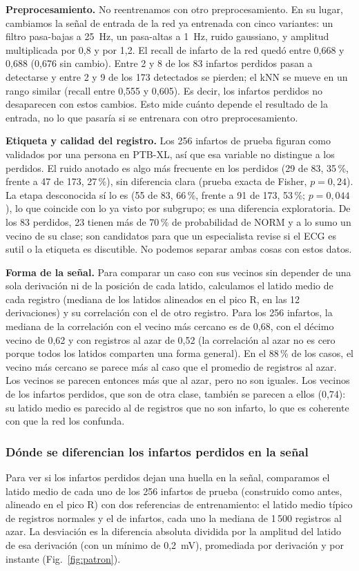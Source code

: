 \documentclass[conference]{IEEEtran}
\begin{document}
\textbf{Preprocesamiento.} No reentrenamos con otro preprocesamiento. En su lugar, cambiamos la señal de entrada de la red ya entrenada con cinco variantes: un filtro pasa-bajas a 25~Hz, un pasa-altas a 1~Hz, ruido gaussiano, y amplitud multiplicada por 0,8 y por 1,2. El recall de infarto de la red quedó entre 0,668 y 0,688 (0,676 sin cambio). Entre 2 y 8 de los 83 infartos perdidos pasan a detectarse y entre 2 y 9 de los 173 detectados se pierden; el kNN se mueve en un rango similar (recall entre 0,555 y 0,605). Es decir, los infartos perdidos no desaparecen con estos cambios. Esto mide cuánto depende el resultado de la entrada, no lo que pasaría si se entrenara con otro preprocesamiento.

\textbf{Etiqueta y calidad del registro.} Los 256 infartos de prueba figuran como validados por una persona en PTB-XL, así que esa variable no distingue a los perdidos. El ruido anotado es algo más frecuente en los perdidos (29 de 83, 35\,\%, frente a 47 de 173, 27\,\%), sin diferencia clara (prueba exacta de Fisher, $p=0{,}24$). La etapa desconocida sí lo es (55 de 83, 66\,\%, frente a 91 de 173, 53\,\%; $p=0{,}044$), lo que coincide con lo ya visto por subgrupo; es una diferencia exploratoria. De los 83 perdidos, 23 tienen más de 70\,\% de probabilidad de NORM y a lo sumo un vecino de su clase; son candidatos para que un especialista revise si el ECG es sutil o la etiqueta es discutible. No podemos separar ambas cosas con estos datos.

\textbf{Forma de la señal.} Para comparar un caso con sus vecinos sin depender de una sola derivación ni de la posición de cada latido, calculamos el latido medio de cada registro (mediana de los latidos alineados en el pico R, en las 12 derivaciones) y su correlación con el de otro registro. Para los 256 infartos, la mediana de la correlación con el vecino más cercano es de 0,68, con el décimo vecino de 0,62 y con registros al azar de 0,52 (la correlación al azar no es cero porque todos los latidos comparten una forma general). En el 88\,\% de los casos, el vecino más cercano se parece más al caso que el promedio de registros al azar. Los vecinos se parecen entonces más que al azar, pero no son iguales. Los vecinos de los infartos perdidos, que son de otra clase, también se parecen a ellos (0,74): su latido medio es parecido al de registros que no son infarto, lo que es coherente con que la red los confunda.

\subsubsection{Dónde se diferencian los infartos perdidos en la señal}
Para ver si los infartos perdidos dejan una huella en la señal, comparamos el latido medio de cada uno de los 256 infartos de prueba (construido como antes, alineado en el pico R) con dos referencias de entrenamiento: el latido medio típico de registros normales y el de infartos, cada uno la mediana de 1\,500 registros al azar. La desviación es la diferencia absoluta dividida por la amplitud del latido de esa derivación (con un mínimo de 0,2~mV), promediada por derivación y por instante (Fig.~\ref{fig:patron}).
\end{document}

